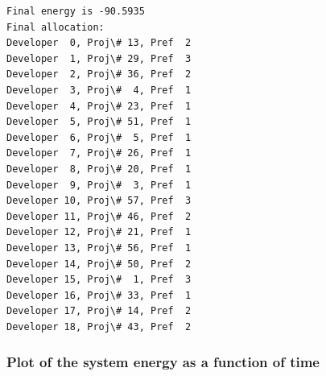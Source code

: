 \documentclass[11pt]{article}
\begin{document}
\begin{shaded*}    \begin{Verbatim}[commandchars=\\\{\}]
Final energy is -90.5935
Final allocation: 
Developer  0, Proj\# 13, Pref  2
Developer  1, Proj\# 29, Pref  3
Developer  2, Proj\# 36, Pref  2
Developer  3, Proj\#  4, Pref  1
Developer  4, Proj\# 23, Pref  1
Developer  5, Proj\# 51, Pref  1
Developer  6, Proj\#  5, Pref  1
Developer  7, Proj\# 26, Pref  1
Developer  8, Proj\# 20, Pref  1
Developer  9, Proj\#  3, Pref  1
Developer 10, Proj\# 57, Pref  3
Developer 11, Proj\# 46, Pref  2
Developer 12, Proj\# 21, Pref  1
Developer 13, Proj\# 56, Pref  1
Developer 14, Proj\# 50, Pref  2
Developer 15, Proj\#  1, Pref  3
Developer 16, Proj\# 33, Pref  1
Developer 17, Proj\# 14, Pref  2
Developer 18, Proj\# 43, Pref  2
\end{Verbatim}
\end{shaded*}

    \subsubsection{Plot of the system energy as a function of
time}\label{plot-of-the-system-energy-as-a-function-of-time}
\end{document}
